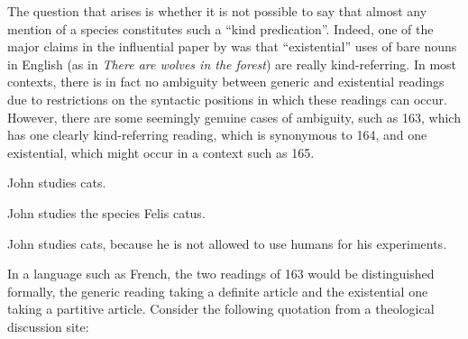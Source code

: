 \begin{styleBodyTextFirst}
The question that arises is whether it is not possible to say that almost any mention of a species constitutes such a “kind predication”. Indeed, one of the major claims in the influential paper by \citet{Carlson1977} was that “existential” uses of bare nouns in English (as in \textit{There are wolves in the forest}) are really kind-referring. In most contexts, there is in fact no ambiguity between generic and existential readings due to restrictions on the syntactic positions in which these readings can occur. However, there are some seemingly genuine cases of ambiguity, such as 163, which has one clearly kind-referring reading, which is synonymous to 164, and one existential, which might occur in a context such as 165.

\end{styleBodyTextFirst}

\begin{listWWNumileveli}
\item {}

\begin{styleExample}
\label{bkm:Ref107049066}John studies cats.

\end{styleExample}

\item {}

\begin{styleExample}
\label{bkm:Ref107049087}John studies the species Felis catus.

\end{styleExample}

\item {}

\begin{styleExample}
\label{bkm:Ref107049114}John studies cats, because he is not allowed to use humans for his experiments. 

\end{styleExample}

\end{listWWNumileveli}

\begin{styleBodyTextFirst}
In a language such as French, the two readings of 163 would be distinguished formally, the generic reading taking a definite article and the existential one taking a partitive article. Consider the following quotation from a theological discussion site:

\end{styleBodyTextFirst}

